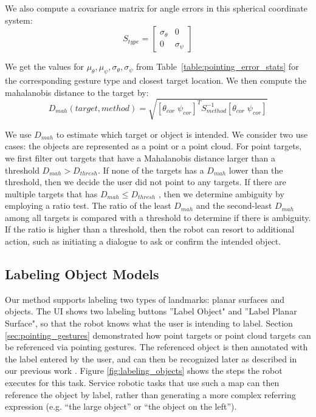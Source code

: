 \documentclass{tADR2e}
\begin{document}
We also compute a covariance matrix for angle errors in this spherical coordinate system: 
$$S_{type} = \begin{bmatrix}
\sigma_{\theta}&0\\ 0&\sigma_{\psi}
\end{bmatrix} $$

We get the values for $\mu_{\theta}, \mu_{\psi}, \sigma_{\theta} ,\sigma_{\psi}$ from Table~\ref{table:pointing_error_stats} for the corresponding gesture type and closest target location. We then compute the mahalanobis distance to the target by:
$$D_{mah}(target,method)=\sqrt{ [\theta_{cor}\;\psi_{cor}]^T S_{method}^{-1} [\theta_{cor}\;\psi_{cor}]}$$
 
We use $D_{mah}$ to estimate which target or object is intended. We consider two use cases: the objects are represented as a point or a point cloud. For point targets, we first filter out targets that have a Mahalanobis distance larger than a threshold $D_{mah} > D_{thresh}$. If none of the targets has a $D_{mah}$ lower than the threshold, then we decide the user did not point to any targets. If there are multiple targets that has $D_{mah} \leq D_{thresh}$ , then we determine ambiguity by employing a ratio test. The ratio of the least $D_{mah}$ and the second-least $D_{mah}$ among all targets is compared with a threshold to determine if there is ambiguity. If the ratio is higher than a threshold, then the robot can resort to additional action, such as initiating a dialogue to ask or confirm the intended object.


\subsection{Labeling Object Models}
\label{sec:object_labeling}

Our method supports labeling two types of landmarks: planar surfaces and objects. The UI shows two labeling buttons ''Label Object" and ''Label Planar Surface", so that the robot knows what the user is intending to label. Section \ref{sec:pointing_gestures} demonstrated how point targets or point cloud targets can be referenced via pointing gestures. The referenced object is then annotated
with the label entered by the user, and can then be recognized later as described in our previous work \cite{trevor2013interactive}. Figure \ref{fig:labeling_objects} shows the steps the robot executes for this task. Service robotic tasks that use such a map can then reference the object
by label, rather than generating a more complex referring expression (e.g. “the large
object” or “the object on the left”).
\end{document}
